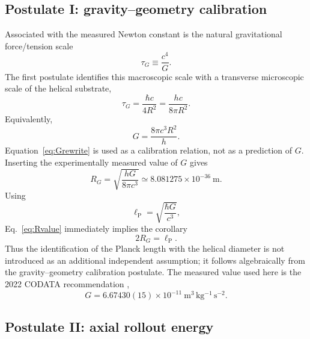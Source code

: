 \documentclass[aps,prd,reprint,nofootinbib,floatfix]{revtex4-2}
\begin{document}
\subsection{Postulate I: gravity--geometry calibration}

Associated with the measured Newton constant is the natural gravitational force/tension scale
\begin{equation}
\tau_G\equiv\frac{c^4}{G}.
\label{eq:tension}
\end{equation}
The first postulate identifies this macroscopic scale with a transverse microscopic scale of the helical substrate,
\begin{equation}
\boxed{\tau_G=\frac{\hbar c}{4R^2}=\frac{hc}{8\pi R^2}}.
\label{eq:calpostulate}
\end{equation}
Equivalently,
\begin{equation}
\boxed{G=\frac{8\pi c^3R^2}{h}}.
\label{eq:Grewrite}
\end{equation}
Equation~\eqref{eq:Grewrite} is used as a calibration relation, not as a prediction of $G$.  Inserting the experimentally measured value of $G$ gives
\begin{equation}
R_G=\sqrt{\frac{hG}{8\pi c^3}}
\simeq8.081275\times10^{-36}\ \mathrm m.
\label{eq:Rvalue}
\end{equation}
Using
\begin{equation}
\ell_{\mathrm P}=\sqrt{\frac{\hbar G}{c^3}},
\label{eq:lp}
\end{equation}
Eq.~\eqref{eq:Rvalue} immediately implies the corollary
\begin{equation}
\boxed{2R_G=\ell_{\mathrm P}}.
\label{eq:Rcal}
\end{equation}
Thus the identification of the Planck length with the helical diameter is not introduced as an additional independent assumption; it follows algebraically from the gravity--geometry calibration postulate.  The measured value used here is the 2022 CODATA recommendation \cite{NISTG},
\begin{equation}
G=6.67430(15)\times10^{-11}\ \mathrm{m^3\,kg^{-1}\,s^{-2}}.
\end{equation}

\subsection{Postulate II: axial rollout energy}
\end{document}
